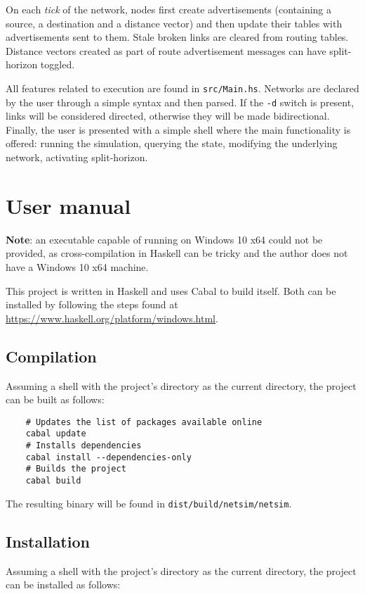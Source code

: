 \documentclass{scrartcl}
\begin{document}
On each \textit{tick} of the network, nodes first create advertisements
(containing a source, a destination and a distance vector) and then update their
tables with advertisements sent to them. Stale broken links are cleared from
routing tables. Distance vectors created as part of route advertisement messages
can have split-horizon toggled.

All features related to execution are found in \texttt{src/Main.hs}. Networks
are declared by the user through a simple syntax and then parsed. If the
\texttt{-d} switch is present, links will be considered directed, otherwise
they will be made bidirectional. Finally, the user is presented with a simple
shell where the main functionality is offered: running the simulation, querying
the state, modifying the underlying network, activating split-horizon.

\section{User manual}

\textbf{Note}: an executable capable of running on Windows 10 x64 could not be
provided, as cross-compilation in Haskell can be tricky and the author does not
have a Windows 10 x64 machine.

This project is written in Haskell and uses Cabal to build itself. Both can be
installed by following the steps found at
\url{https://www.haskell.org/platform/windows.html}. 

\subsection{Compilation}

Assuming a shell with the project's directory as the current directory, the
project can be built as follows:

\begin{verbatim}
    # Updates the list of packages available online
    cabal update
    # Installs dependencies
    cabal install --dependencies-only
    # Builds the project
    cabal build
\end{verbatim}

The resulting binary will be found in \texttt{dist/build/netsim/netsim}.

\subsection{Installation}

Assuming a shell with the project's directory as the current directory, the
project can be installed as follows:
\end{document}
